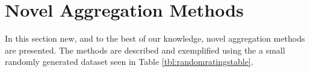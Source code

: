 \section{Novel Aggregation Methods}
In this section new, and to the best of our knowledge, novel aggregation methods are presented. The methods are described and exemplified using the a small randomly generated dataset seen in Table \ref{tbl:randomratingstable}. 

%
%
%
